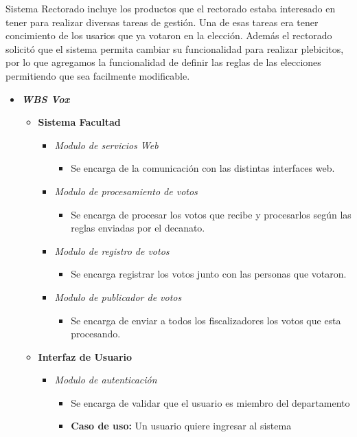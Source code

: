 Sistema Rectorado incluye los productos que el rectorado estaba interesado en tener para realizar diversas tareas de gestión. Una de esas tareas era tener concimiento de los usarios que ya votaron en la elección. Además el rectorado solicitó que el sistema permita cambiar su funcionalidad para realizar plebicitos, por lo que agregamos la funcionalidad de definir las reglas de las elecciones permitiendo que sea facilmente modificable.

\begin{itemize}
 \item {\bf \emph{WBS Vox}}
\begin{itemize}
 \item {\bf Sistema Facultad}
\begin{itemize}
 \item \emph{Modulo de servicios Web} 
\begin{itemize}
 \item Se encarga de la comunicación con las distintas interfaces web.
\end{itemize}
 \item \emph{Modulo de procesamiento de votos} 
\begin{itemize}
 \item Se encarga de procesar los votos que recibe y procesarlos según las reglas enviadas por el decanato.
\end{itemize}
 \item \emph{Modulo de registro de votos} 
\begin{itemize}
 \item Se encarga registrar los votos junto con las personas que votaron.
\end{itemize}
 \item \emph{Modulo de publicador de votos} 
\begin{itemize}
 \item Se encarga de enviar a todos los fiscalizadores los votos que esta procesando.
\end{itemize}
\end{itemize}
 \item {\bf Interfaz de Usuario}
\begin{itemize}
 \item \emph{Modulo de autenticación}
\begin{itemize}
 \item Se encarga de validar que el usuario es miembro del departamento
 \item {\bf Caso de uso:} Un usuario quiere ingresar al sistema
\end{itemize}

\end{itemize}
\end{itemize}
\end{itemize}
